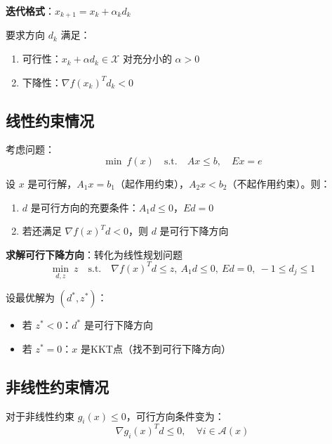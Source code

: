 \begin{algobox}[可行方向法框架]
\textbf{迭代格式}：$x_{k+1} = x_k + \alpha_k d_k$

要求方向 $d_k$ 满足：
\begin{enumerate}[label=(\arabic*)]
    \item 可行性：$x_k + \alpha d_k \in \mathcal{X}$ 对充分小的 $\alpha > 0$
    \item 下降性：$\nabla f(x_k)^T d_k < 0$
\end{enumerate}
\end{algobox}

\subsection{线性约束情况}

考虑问题：
\[
\min\ f(x)\quad \text{s.t.}\quad Ax \leq b,\quad Ex = e
\]

\begin{theorem}[可行方向判定的充要条件]
设 $x$ 是可行解，$A_1 x = b_1$（起作用约束），$A_2 x < b_2$（不起作用约束）。则：
\begin{enumerate}[label=(\arabic*)]
    \item $d$ 是可行方向的充要条件：$A_1 d \leq 0$，$Ed = 0$
    \item 若还满足 $\nabla f(x)^T d < 0$，则 $d$ 是可行下降方向
\end{enumerate}
\end{theorem}

\textbf{求解可行下降方向}：转化为线性规划问题
\[
\min_{d, z}\ z\quad \text{s.t.}\quad \nabla f(x)^T d \leq z,\ A_1 d \leq 0,\ Ed = 0,\ -1 \leq d_j \leq 1
\]

\begin{notebox}[判定准则]
设最优解为 $(d^*, z^*)$：
\begin{itemize}[itemsep=0.3em]
    \item 若 $z^* < 0$：$d^*$ 是可行下降方向
    \item 若 $z^* = 0$：$x$ 是KKT点（找不到可行下降方向）
\end{itemize}
\end{notebox}

\subsection{非线性约束情况}

对于非线性约束 $g_i(x) \leq 0$，可行方向条件变为：
\[
\nabla g_i(x)^T d \leq 0,\quad \forall i \in \mathcal{A}(x)
\]


